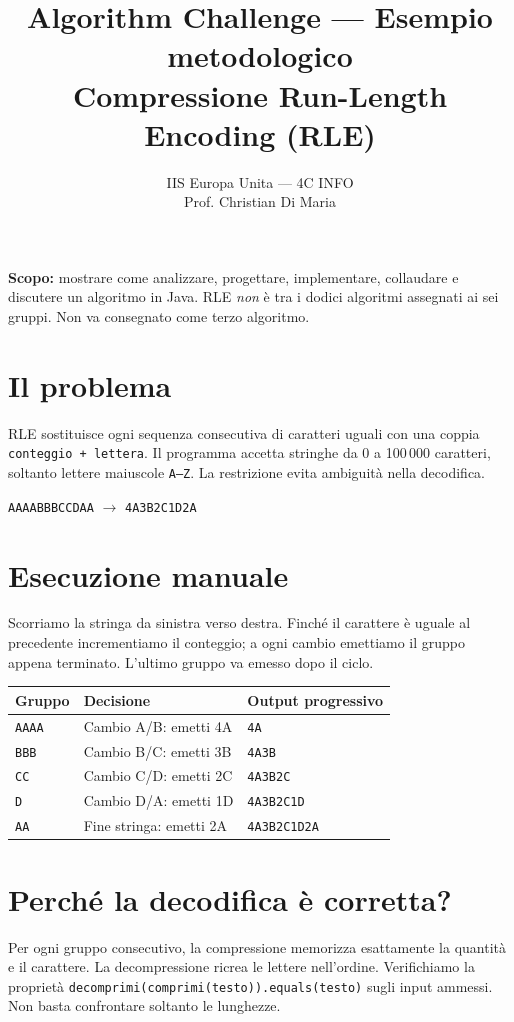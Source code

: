 \documentclass[11pt,a4paper]{article}
\title{\textbf{Algorithm Challenge --- Esempio metodologico}\\Compressione Run-Length Encoding (RLE)}
\author{IIS Europa Unita --- 4C INFO\\Prof. Christian Di Maria}
\date{}
\begin{document}
\maketitle
\noindent\textbf{Scopo:} mostrare come analizzare, progettare, implementare, collaudare e discutere un algoritmo in Java. RLE \emph{non} è tra i dodici algoritmi assegnati ai sei gruppi. Non va consegnato come terzo algoritmo.

\section{Il problema}
RLE sostituisce ogni sequenza consecutiva di caratteri uguali con una coppia \texttt{conteggio + lettera}. Il programma accetta stringhe da 0 a 100\,000 caratteri, soltanto lettere maiuscole \texttt{A--Z}. La restrizione evita ambiguità nella decodifica.

\begin{center}
\large\texttt{AAAABBBCCDAA} $\longrightarrow$ \texttt{4A3B2C1D2A}
\end{center}

\section{Esecuzione manuale}
Scorriamo la stringa da sinistra verso destra. Finché il carattere è uguale al precedente incrementiamo il conteggio; a ogni cambio emettiamo il gruppo appena terminato. L'ultimo gruppo va emesso dopo il ciclo.

\begin{tabularx}{\linewidth}{@{}lXl@{}}
\toprule
Gruppo & Decisione & Output progressivo\\
\midrule
\texttt{AAAA} & Cambio A/B: emetti 4A & \texttt{4A}\\
\texttt{BBB} & Cambio B/C: emetti 3B & \texttt{4A3B}\\
\texttt{CC} & Cambio C/D: emetti 2C & \texttt{4A3B2C}\\
\texttt{D} & Cambio D/A: emetti 1D & \texttt{4A3B2C1D}\\
\texttt{AA} & Fine stringa: emetti 2A & \texttt{4A3B2C1D2A}\\
\bottomrule
\end{tabularx}

\section{Perché la decodifica è corretta?}
Per ogni gruppo consecutivo, la compressione memorizza esattamente la quantità e il carattere. La decompressione ricrea le lettere nell'ordine. Verifichiamo la proprietà \texttt{decomprimi(comprimi(testo)).equals(testo)} sugli input ammessi. Non basta confrontare soltanto le lunghezze.
\end{document}
